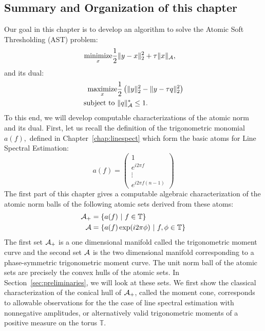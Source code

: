 \subsection*{Summary and Organization of this chapter} %
\label{sub:main_results}
Our goal in this chapter is to develop an algorithm to solve the Atomic Soft
Thresholding (AST) problem:
\begin{align}
\begin{split}
\mathop{\operatorname{minimize}}_x & \frac{1}{2}\lVert y-x\rVert_2^2 + \tau \lVert x\rVert_{\mathcal{A}},
\end{split}	
\end{align}
and its dual:
\begin{align}
\begin{split}
\mathop{\operatorname{maximize}}_x & \frac{1}{2}\left(\lVert y\rVert_2^2 - \lVert y-\tau q\rVert_2^2\right)\\
\text{subject to } & \lVert q\rVert_{\mathcal{A}}^* \leq 1. 
\end{split}
\end{align}
To this end, we will develop computable characterizations of the atomic norm and its dual. First, let us recall the definition of the trigonometric monomial $a(f),$ defined in Chapter~\ref{chap:linespect} which form the basic atoms for Line Spectral Estimation:
{\footnotesize
\[
a(f) = \begin{pmatrix}
	1\\
	e^{i 2\pi f}\\
	\vdots\\
	e^{i2\pi f (n-1)}
\end{pmatrix}
\]
}
The first part of this chapter gives a computable algebraic characterization of the atomic norm balls of the following atomic sets derived from these atoms:
\begin{align}
\mathcal{A}_+ &= \left\{ a(f) ~\middle|~ f \in \mathbb{T} \right\}\\
\mathcal{A}   &= \left\{ a(f) \exp(i 2\pi \phi) ~\middle|~ f, \phi \in \mathbb{T} \right\}
\end{align}
The first set $\mathcal{A}_+$ is a one dimensional manifold called the trigonometric
moment curve and the second set $\mathcal{A}$ is the two dimensional manifold
corresponding to a phase-symmetric trigonometric moment curve. The unit norm
ball of the atomic sets are precisely the convex hulls of the atomic sets. In
Section~\ref{sec:preliminaries}, we will look at these sets. We first show the
classical characterization of the conical hull of $\mathcal{A}_+$, called the moment
cone, corresponds to allowable observations for the the case of line spectral
estimation with nonnegative amplitudes, or alternatively valid trigonometric
moments of a positive measure on the torus $\mathbb{T}$. 

